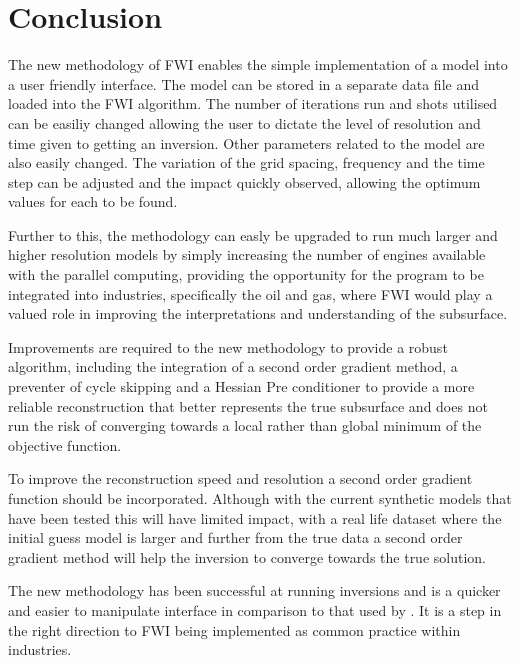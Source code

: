 \chapter{Conclusion}

The new methodology of FWI enables the simple implementation of a model into a user friendly interface. The model can be stored in a separate data file and loaded into the FWI algorithm. The number of iterations run and shots utilised can be easiliy changed allowing the user to dictate the level of resolution and time given to getting an inversion. Other parameters related to the model are also easily changed. The variation of the grid spacing, frequency and the time step can be adjusted and the impact quickly observed, allowing the optimum values for each to be found. 

Further to this, the methodology can easly be upgraded to run much larger and higher resolution models by simply increasing the number of engines available with the parallel computing, providing the opportunity for the program to be integrated into industries, specifically the oil and gas, where FWI would play a valued role in improving the interpretations and understanding of the subsurface. 

Improvements are required to the new methodology to provide a robust algorithm, including  the integration of a second order gradient method, a preventer of cycle skipping and a Hessian Pre conditioner to provide a more reliable reconstruction that better represents the true subsurface and does not run the risk of converging towards a local rather than global minimum of the objective function. 

To improve the reconstruction speed and resolution a second order gradient function should be incorporated. Although with the current synthetic models that have been tested this will have limited impact, with a real life dataset where the initial guess model is larger and further from the true data a second order gradient method will help the inversion to converge towards the true solution. 

The new methodology has been successful at running inversions and is a quicker and easier to manipulate interface in comparison to that used by \citet{guasch20123d}. It is a step in the right direction to FWI being implemented as common practice within industries. 

